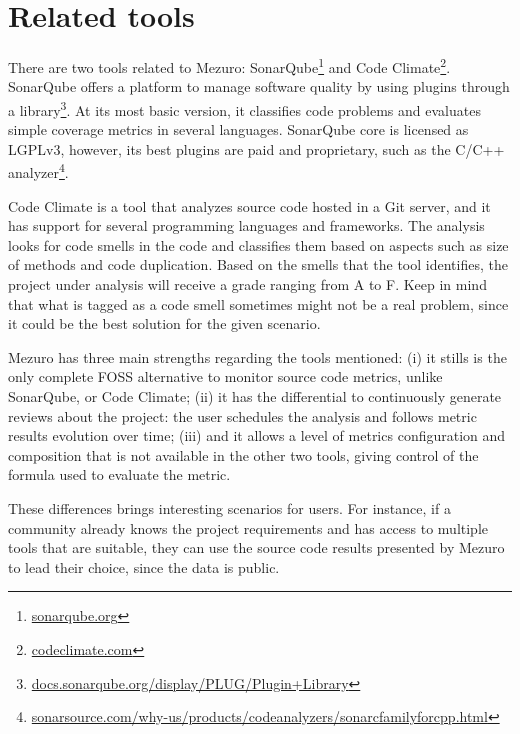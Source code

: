 \section{Related tools}

There are two tools related to Mezuro: SonarQube\footnote{\url{sonarqube.org}}
and Code Climate\footnote{\url{codeclimate.com}}. SonarQube offers a platform
to manage software quality by using plugins through a
library\footnote{\url{docs.sonarqube.org/display/PLUG/Plugin+Library}}.
%
At its most basic version, it classifies code problems and evaluates simple
coverage metrics in several languages. SonarQube core is licensed as LGPLv3,
however, its best plugins are paid and proprietary, such as the C/C++
analyzer\footnote{\url{sonarsource.com/why-us/products/codeanalyzers/sonarcfamilyforcpp.html}}.

Code Climate is a tool that analyzes source code hosted in a Git server, and it
has support for several programming languages and frameworks. The analysis
looks for code smells in the code and classifies them based on aspects such as
size of methods and code duplication. Based on the smells that the tool
identifies, the project under analysis will receive a grade ranging from A to
F. Keep in mind that what is tagged as a code smell sometimes might not be a
real problem, since it could be the best solution for the given scenario.

Mezuro has three main strengths regarding the tools mentioned: (i) it stills
is the only complete FOSS alternative to monitor source code metrics, unlike
SonarQube, or Code Climate; (ii) it has the differential to continuously
generate reviews about the project: the user schedules the analysis and follows
metric results evolution over time; (iii) and it allows a level of metrics
configuration and composition that is not available in the other two tools,
giving control of the formula used to evaluate the metric.

These differences brings interesting scenarios for users. For instance, if a
community already knows the project requirements and has access to multiple
tools that are suitable, they can use the source code results presented by
Mezuro to lead their choice, since the data is public.

